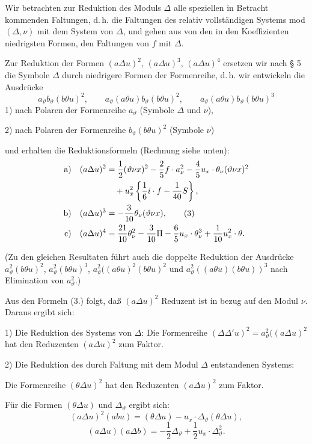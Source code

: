 \documentclass[11pt]{article}
\newcommand{\A}{\Delta}
\begin{document}
Wir betrachten zur Reduktion des Moduls $\A$ alle speziellen in Betracht kommenden Faltungen, d.\,h. die Faltungen des relativ vollständigen Systems mod $(\A,\nu)$ mit dem System von $\A$, und gehen aus von den in den Koeffizienten niedrigsten Formen, den Faltungen von $f$ mit $\A$.

Zur Reduktion der Formen $(a\A u)^2$, $(a\A u)^3$, $(a\A u)^4$ ersetzen wir nach § 5 die Symbole $\A$ durch niedrigere Formen der Formenreihe, d.\,h. wir entwickeln die Ausdrücke
\[
a_\vartheta b_\vartheta(b\theta u)^2,\qquad
a_\vartheta(a\theta u)b_\vartheta(b\theta u)^2,\qquad
a_\vartheta(a\theta u)b_\vartheta(b\theta u)^3
\]
1) nach Polaren der Formenreihe $a_\vartheta$ (Symbole $\A$ und $\nu$),

2) nach Polaren der Formenreihe $b_\vartheta(b\theta u)^2$ (Symbole $\nu$)

und erhalten die Reduktionsformeln (Rechnung siehe unten):
\begin{align}
\text{a)}\quad (a\A u)^2
&=\frac12(\vartheta\nu x)^2-\frac25 f\cdot a_\nu^2
-\frac45u_x\cdot\theta_\nu(\vartheta\nu x)^2 \notag\\
&\quad+u_x^2\left\{\frac16 i\cdot f-\frac1{40}S\right\},\notag\\
\text{b)}\quad (a\A u)^3
&=-\frac3{10}\theta_\nu(\vartheta\nu x),\tag{3}\\
\text{c)}\quad (a\A u)^4
&=\frac{21}{10}\theta_\nu^2-\frac3{10}\Pi
-\frac65u_x\cdot\theta_\nu^3+\frac1{10}u_x^2\cdot\theta .\notag
\end{align}

(Zu den gleichen Resultaten führt auch die doppelte Reduktion der Ausdrücke $a_\vartheta^2(b\theta u)^2$, $a_\vartheta^2(b\theta u)^3$, $a_\vartheta^2((a\theta u)^2(b\theta u)^2$ und $a_\vartheta^2((a\theta u)(b\theta u))^3$ nach Elimination von $a_\vartheta^2$.)

Aus den Formeln (3.) folgt, daß $(a\A u)^2$ Reduzent ist in bezug auf den Modul $\nu$. Daraus ergibt sich:

1) Die Reduktion des Systems von $\A$: Die Formenreihe $(\A\A' u)^2=a_\vartheta^2((a\A u)^2$ hat den Reduzenten $(a\A u)^2$ zum Faktor.

2) Die Reduktion des durch Faltung mit dem Modul $\A$ entstandenen Systems:

Die Formenreihe $(\theta\A u)^2$ hat den Reduzenten $(a\A u)^2$ zum Faktor.

Für die Formen $(\theta\A u)$ und $\A_\vartheta$ ergibt sich:
\[
(a\A u)^2(abu)=(\theta\A u)-u_x\cdot\A_\vartheta(\theta\A u),
\]
\[
(a\A u)(a\A b)=-\frac12\A_\vartheta+\frac12u_x\cdot\A_\vartheta^2.
\]
\end{document}
